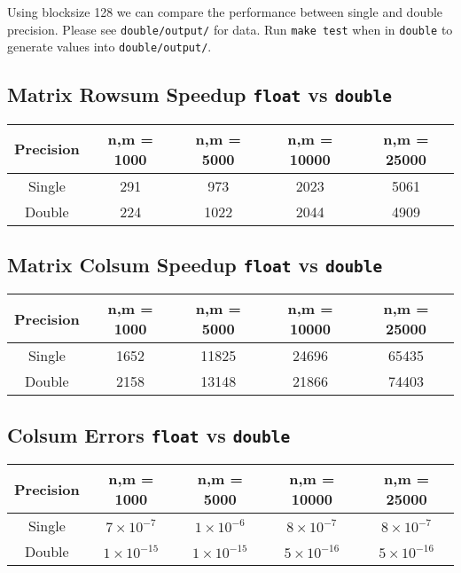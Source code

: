 \documentclass[a4paper, fleqn]{article}
\begin{document}
Using blocksize 128 we can compare the performance between single and double precision. Please see \texttt{double/output/} for data. Run \texttt{make test} when in \texttt{double} to generate values into \texttt{double/output/}.  

\subsection{Matrix Rowsum Speedup \texttt{float} vs \texttt{double}  }%
\begin{center}
 \begin{tabular}{||c | c | c | c | c ||}
 \hline
 Precision & n,m = 1000 & n,m = 5000 & n,m = 10000 & n,m = 25000 \\ [0.5ex] 
 \hline
 Single & 291 & 973 & 2023 & 5061 \\
 \hline
 Double & 224 & 1022 & 2044 & 4909 \\
 \hline
 \hline
\end{tabular}
\end{center}

\subsection{Matrix Colsum Speedup \texttt{float} vs \texttt{double}  }%
\begin{center}
 \begin{tabular}{||c | c | c | c | c ||}
 \hline
 Precision & n,m = 1000 & n,m = 5000 & n,m = 10000 & n,m = 25000 \\ [0.5ex] 
 \hline
 Single & 1652 & 11825 & 24696 & 65435 \\
 \hline
 Double & 2158 & 13148 & 21866 & 74403 \\
 \hline
 \hline
\end{tabular}
\end{center}

\subsection{Colsum Errors \texttt{float} vs \texttt{double}  }%
\begin{center}
 \begin{tabular}{||c | c | c | c | c ||}
 \hline
 Precision & n,m = 1000 & n,m = 5000 & n,m = 10000 & n,m = 25000 \\ [0.5ex] 
 \hline
 Single & $7\times10^{-7}$ & $1\times10^{-6}$& $8\times10^{-7}$& $8\times10^{-7}$\\
 \hline
 Double & $1\times10^{-15}$ & $1\times10^{-15}$& $5\times10^{-16}$& $5\times10^{-16}$\\
 \hline
 \hline
\end{tabular}
\end{center}
\end{document}
